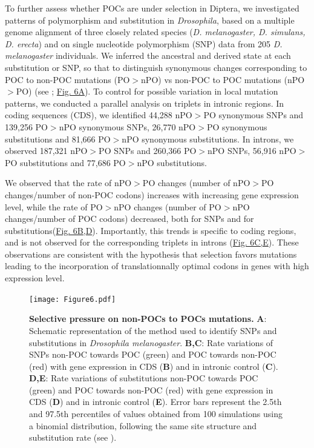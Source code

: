 To further assess whether POCs are under selection in Diptera, we investigated patterns of polymorphism and substitution in \textit{Drosophila}, based on a multiple genome alignment of three closely related species (\textit{D. melanogaster, D. simulans, D. erecta}) and on single nucleotide polymorphism (SNP) data from 205 \textit{D. melanogaster} individuals. We inferred the ancestral and derived state at each substitution or SNP, so that to distinguish synonymous changes corresponding to POC to non-POC mutations (PO$>$nPO) vs non-POC to POC mutations (nPO$>$PO) (see ; \hyperref[fig:CU6]{Fig. 6A}). To control for possible variation in local mutation patterns, we conducted a parallel analysis on triplets in intronic regions. In coding sequences (CDS), we identified 44,288 nPO$>$PO synonymous SNPs and 139,256 PO$>$nPO synonymous SNPs, 26,770 nPO$>$PO synonymous substitutions and 81,666 PO$>$nPO synonymous substitutions. In introns, we observed 187,321 nPO$>$PO SNPs and 260,366 PO$>$nPO SNPs, 56,916 nPO$>$PO substitutions and 77,686 PO$>$nPO substitutions. 

We observed that the rate of nPO$>$PO changes (number of nPO$>$PO changes/number of non-POC codons) increases with increasing gene expression level, while the rate of PO$>$nPO changes (number of PO$>$nPO changes/number of POC codons) decreased, both for SNPs and for substitutions(\hyperref[fig:CU6]{Fig. 6B,D}). Importantly, this trends is specific to coding regions, and is not observed for the corresponding triplets in introns (\hyperref[fig:CU6]{Fig. 6C,E}). These observations are consistent with the hypothesis that selection favors mutations leading to the incorporation of translationnally optimal codons in genes with high expression level.



\begin{figure}[t]
    \begin{center}
        \texttt{[image: Figure6.pdf]}
    \end{center}                                                                       
    \caption[Selective pressure on non-POCs to POCs mutations]{\textbf{Selective pressure on non-POCs to POCs mutations.} \textbf{A}: Schematic representation of the method used to identify SNPs and substitutions in \textit{Drosophila melanogaster}. 
    \textbf{B,C}: Rate variations of SNPs non-POC towards POC (green) and POC towards non-POC (red) with gene expression in CDS (\textbf{B}) and in intronic control (\textbf{C}). 
    \textbf{D,E}: Rate variations of substitutions non-POC towards POC (green) and POC towards non-POC (red) with gene expression in CDS (\textbf{D}) and in intronic control (\textbf{E}). Error bars represent the 2.5th and 97.5th percentiles of values obtained from 100 simulations using a binomial distribution, following the same site structure and substitution rate (see ).}
    \label{fig:CU6}
\end{figure}


